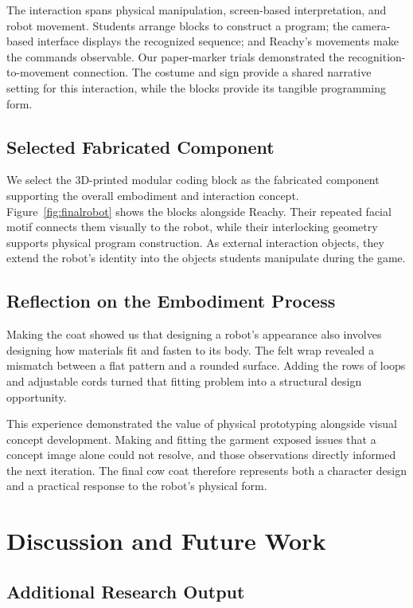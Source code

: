 \documentclass[conference]{IEEEtran}
\begin{document}
The interaction spans physical manipulation, screen-based interpretation, and robot movement. Students arrange blocks to construct a program; the camera-based interface displays the recognized sequence; and Reachy's movements make the commands observable. Our paper-marker trials demonstrated the recognition-to-movement connection. The costume and sign provide a shared narrative setting for this interaction, while the blocks provide its tangible programming form.

\subsection{Selected Fabricated Component}

We select the 3D-printed modular coding block as the fabricated component supporting the overall embodiment and interaction concept. Figure~\ref{fig:finalrobot} shows the blocks alongside Reachy. Their repeated facial motif connects them visually to the robot, while their interlocking geometry supports physical program construction. As external interaction objects, they extend the robot's identity into the objects students manipulate during the game.

\subsection{Reflection on the Embodiment Process}

Making the coat showed us that designing a robot's appearance also involves designing how materials fit and fasten to its body. The felt wrap revealed a mismatch between a flat pattern and a rounded surface. Adding the rows of loops and adjustable cords turned that fitting problem into a structural design opportunity.

This experience demonstrated the value of physical prototyping alongside visual concept development. Making and fitting the garment exposed issues that a concept image alone could not resolve, and those observations directly informed the next iteration. The final cow coat therefore represents both a character design and a practical response to the robot's physical form.


\section{Discussion and Future Work}

\subsection{Additional Research Output}
\label{sec:addoutput}
\end{document}
